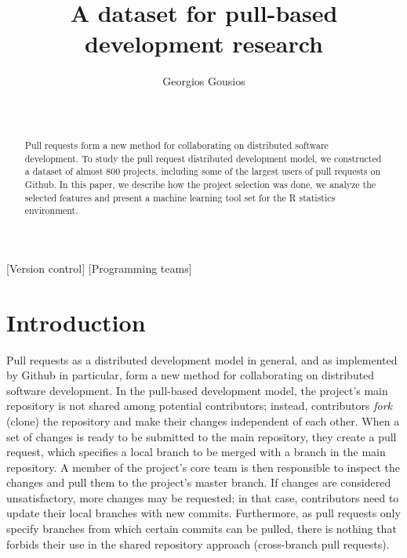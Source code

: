 \documentclass{sig-alternate}
\begin{document}
\newcommand{\todo}[1]{\textbf{TODO}\footnote{\textbf{TODO:} #1}}

\newcommand{\ghtorrent}{ \textsc{ght}orrent\xspace}
\newcommand{\api}{\textsc{api}\xspace}
\newcommand{\pullreqs}{ \textsf{pullreqs}\xspace}

\title{A dataset for pull-based development research}

\author{
\alignauthor
Georgios Gousios\\
       \\
       \\
}

\maketitle

\begin{abstract}

Pull requests form a new method for collaborating on distributed software
development. To study the pull request distributed development model, we
constructed a dataset of almost 800 projects, including some of the largest
users of pull requests on Github. In this paper, we describe how the project
selection was done, we analyze the selected features and present a machine
learning tool set for the R statistics environment. 

\end{abstract}

[Version control]
[Programming teams]



\section{Introduction}
\label{sec:intro}

Pull requests as a distributed development model in general, and as implemented
by Github in particular, form a new method for collaborating on distributed
software development. In the pull-based development model, the project's main
repository is not shared among potential contributors; instead, contributors
\emph{fork} (clone) the repository and make their changes independent of each
other. When a set of changes is ready to be submitted to the main repository,
they create a pull request, which specifies a local branch to be merged with a
branch in the main repository. A member of the project's core team is then
responsible to inspect the changes and pull them to the project's master branch.
If changes are considered unsatisfactory, more changes may be requested; in that
case, contributors need to update their local branches with new commits.
Furthermore, as pull requests only specify branches from which certain commits
can be pulled, there is nothing that forbids their use in the shared 
repository approach (cross-branch pull requests).
\end{document}
